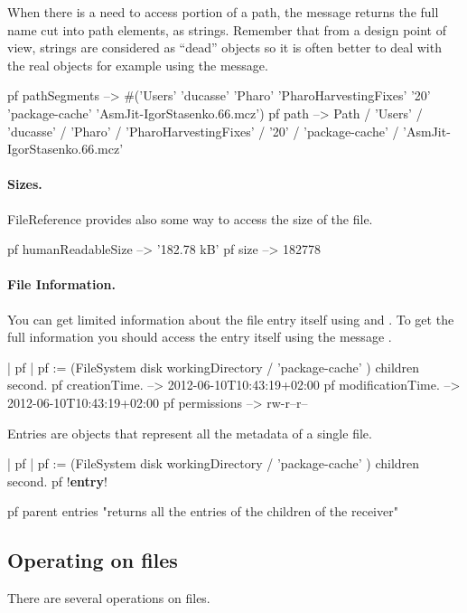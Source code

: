 \documentclass[a4paper,10pt,twoside]{book}
\begin{document}
When there is a need to access portion of a path, the message  returns the full name cut into path elements, as strings. 
Remember that from a design point of view, strings are considered as ``dead'' objects so it is often better to deal with the real objects for example using
the  message. 


\begin{code}{}
pf pathSegments  
	-->  #('Users' 'ducasse' 'Pharo' 'PharoHarvestingFixes' '20' 'package-cache' 'AsmJit-IgorStasenko.66.mcz')
pf path
    -->  Path / 'Users' / 'ducasse' / 'Pharo' / 'PharoHarvestingFixes' / '20' / 'package-cache' / 'AsmJit-IgorStasenko.66.mcz'
\end{code}

\paragraph{Sizes.}
FileReference provides also some way to access the size of the file. 

\begin{code}{}
pf humanReadableSize 
	--> '182.78 kB'
pf size 
	--> 182778
\end{code}  


\paragraph{File Information.}

You can get limited information about the file entry itself using  and . 
To get the full information you should access the entry itself using the message . 

\begin{code}{}
| pf |
pf := (FileSystem disk workingDirectory / 'package-cache' ) children second.
pf creationTime.
--> 2012-06-10T10:43:19+02:00
pf modificationTime.
--> 2012-06-10T10:43:19+02:00
pf permissions
--> rw-r--r--
\end{code}

Entries are objects that represent all the metadata of a single file. 
\begin{code}{}
| pf |
pf := (FileSystem disk workingDirectory / 'package-cache' ) children second.
pf !\textbf{entry}!

pf parent entries
	"returns all the entries of the children of the receiver"
\end{code}


\subsection{Operating on files}
There are several operations on files.
\end{document}
